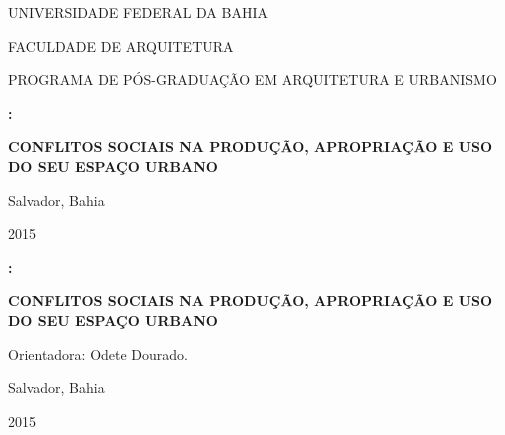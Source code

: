 \documentclass[
	12pt,					%
	openright,			%
	twoside,			%
	a4paper,			%
	english,				%
	french,				%
	spanish,			%
	brazil				%
	]{abntex2}
\newcommand{\subtitulo}{\bfseries Conflitos sociais na produção, apropriação e uso do seu espaço urbano}
\begin{document}
\frenchspacing 






\begin{titlingpage}
\bfseries 
\centering

\fontsize{16}{18}\selectfont UNIVERSIDADE FEDERAL DA BAHIA

\fontsize{14}{16}\selectfont FACULDADE DE ARQUITETURA

\normalsize PROGRAMA DE PÓS-GRADUAÇÃO EM ARQUITETURA E URBANISMO





\vspace{3cm}

\MakeUppercase{\bfseries\fontsize{14}{16}\selectfont\imprimirautor}

\vspace{3cm}

\MakeUppercase{\fontsize{14}{16}\selectfont\bfseries\imprimirtitulo:}

\medskip
\MakeUppercase{\subtitulo}

\vfill

\normalfont\fontsize{14}{16}\selectfont
Salvador, Bahia

2015


\end{titlingpage}

\begin{titlingpage}
\centering
\MakeUppercase{\bfseries\fontsize{14}{16}\selectfont\imprimirautor}

\vspace{3cm}

\MakeUppercase{\fontsize{14}{16}\selectfont\bfseries\imprimirtitulo:}

\medskip
\MakeUppercase{\subtitulo}

\vspace*{\fill}

\normalfont

\normalsize

\begin{flushright}
	\begin{minipage}{.5\textwidth}
	\SingleSpacing
	\imprimirpreambulo
	
	\medskip
	Orientadora: Odete Dourado.
\end{minipage}%
\end{flushright}
\vspace*{\fill}
%

\vfill

\normalfont\fontsize{14}{16}\selectfont

Salvador, Bahia

2015
	

\end{titlingpage}
\end{document}
